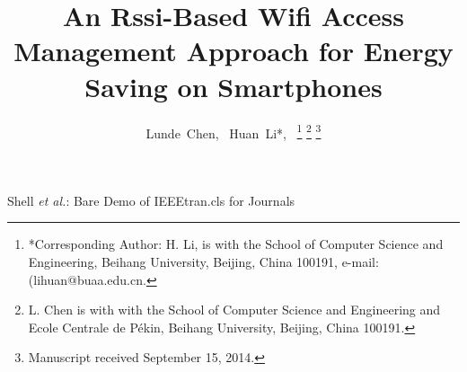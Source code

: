 \documentclass[journal]{IEEEtran}
\begin{document}
%
\title{An Rssi-Based Wifi Access Management Approach for Energy Saving on Smartphones}
%
%
%

\author{Lunde~Chen,
        ~Huan~Li*,~%
\thanks{*Corresponding Author: H. Li,  is with the School
of Computer Science and Engineering, Beihang University, Beijing,
China 100191,  e-mail: (lihuan@buaa.edu.cn.}%
\thanks{L. Chen is with with the School of Computer Science and Engineering and Ecole Centrale de Pékin, Beihang University, Beijing, China 100191.}%
\thanks{Manuscript received September 15, 2014.}}

% 
%



{Shell \MakeLowercase{\textit{et al.}}: Bare Demo of IEEEtran.cls for Journals}
% 
\end{document}

